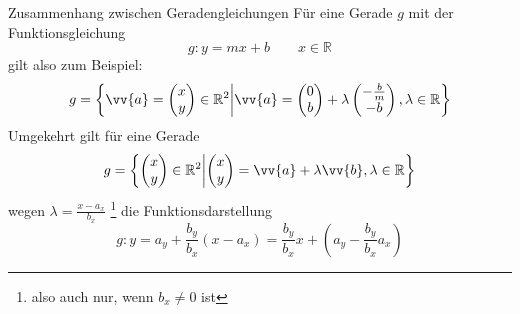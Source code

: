 \begin{frame}{Zusammenhang zwischen Geradengleichungen}
	Für eine Gerade $g$ mit der Funktionsgleichung
	\[
	g: y = m x + b \qquad x \in \mathbb{R}
	\]
	gilt also zum Beispiel:
	\[
	g = \left\{ \vv{a} = \begin{pmatrix}x \\ y\end{pmatrix} \in \mathbb{R}^2 \middle| \vv{a} = \begin{pmatrix}
	0 \\ b
	\end{pmatrix} + \lambda \begin{pmatrix}
	-\frac{b}{m} \\ -b
	\end{pmatrix}, \lambda \in \mathbb{R} \right\}
	\]
	Umgekehrt gilt für eine Gerade
	\[
	g = \left\{ \begin{pmatrix}x \\ y\end{pmatrix} \in \mathbb{R}^2 \middle| \begin{pmatrix}
	x \\ y
	\end{pmatrix} = \vv{a}  + \lambda \vv{b}, \lambda \in \mathbb{R} \right\}
	\]
	wegen $\lambda = \frac{x-a_x}{b_x}$ \footnote{also auch nur, wenn $b_x \neq 0$ ist} die Funktionsdarstellung
	\[
	g: y = a_y + \frac{b_y}{b_x} \left( x - a_x \right) = \frac{b_y}{b_x} x + \left(a_y - \frac{b_y}{b_x} a_x\right)
	\]
\end{frame}


